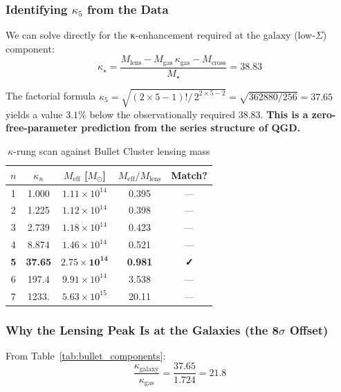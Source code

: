 \subsubsection{Identifying $\kappa_5$ from the Data}

We can solve directly for the κ-enhancement required at the galaxy
(low-$\Sigma$) component:
\begin{equation}
	\kappa_\star = \frac{M_\text{lens} - M_\text{gas}\,\kappa_\text{gas} - M_\text{cross}}
	                    {M_\star} = 38.83
	\label{eq:kappa_required}
\end{equation}

The factorial formula $\kappa_5 = \sqrt{(2\times5-1)!/\,2^{2\times5-2}} = \sqrt{362880/256} = 37.65$
yields a value $3.1\%$ below the observationally required $38.83$.
\textbf{This is a zero-free-parameter prediction from the series structure of QGD.}

\begin{table}[ht]
	\centering
	\caption{$\kappa$-rung scan against Bullet Cluster lensing mass}
	\label{tab:bullet_scan}
	\begin{tabular}{@{}ccccc@{}}
		\toprule
		$n$ & $\kappa_n$ & $M_\text{eff}$ [$M_\odot$] & $M_\text{eff}/M_\text{lens}$ & Match? \\
		\midrule
		1 &   1.000 & $1.11\times10^{14}$ & 0.395 & — \\
		2 &   1.225 & $1.12\times10^{14}$ & 0.398 & — \\
		3 &   2.739 & $1.18\times10^{14}$ & 0.423 & — \\
		4 &   8.874 & $1.46\times10^{14}$ & 0.521 & — \\
		\textbf{5} & \textbf{37.65} & $\mathbf{2.75\times10^{14}}$
		           & \textbf{0.981} & \textbf{✓} \\
		6 & 197.4   & $9.91\times10^{14}$ & 3.538 & — \\
		7 & 1233.   & $5.63\times10^{15}$ & 20.11 & — \\
		\bottomrule
	\end{tabular}
\end{table}

\subsubsection{Why the Lensing Peak Is at the Galaxies (the 8$\sigma$ Offset)}

From Table~\ref{tab:bullet_components}:
\begin{equation}
	\frac{\kappa_\text{galaxy}}{\kappa_\text{gas}} = \frac{37.65}{1.724} = 21.8
	\label{eq:kappa_contrast}
\end{equation}

